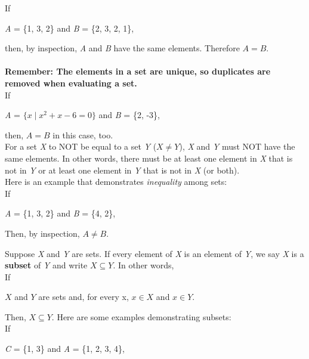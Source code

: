 If

\begin{center}
\textit{A} = \{1, 3, 2\} and \textit{B} = \{2, 3, 2, 1\},
\end{center}

then, by inspection, \textit{A} and \textit{B} have the same elements. Therefore $A = B$.\\\\\textbf{Remember: The elements in a set are unique, so duplicates are removed when evaluating a set.}\\

If

\begin{center}
\textit{A} = $\{x \mid x^2 + x - 6 = 0 \}$ and \textit{B} = \{2, -3\},
\end{center}

then, $A = B$ in this case, too.\\

For a set \textit{X} to NOT be equal to a set \textit{Y} ($X \neq Y$), \textit{X} and \textit{Y} must NOT have the same elements.  In other words, there must be at least one element in \textit{X} that is not in \textit{Y} or at least one element in \textit{Y} that is not in \textit{X} (or both).\\

Here is an example that demonstrates \textit{inequality} among sets:\\

If

\begin{center}
\textit{A} = \{1, 3, 2\} and \textit{B} = \{4, 2\},
\end{center}

Then, by inspection, $A \neq B$.
\clearpage

Suppose \textit{X} and \textit{Y} are sets.  If every element of \textit{X} is an element of \textit{Y}, we say \textit{X} is a \textbf{subset} of \textit{Y} and write $X \subseteq Y$.  In other words,\\

If

\begin{center}
$X$ and $Y$ are sets and, for every x, $x \in X$ and $x \in Y$.
\end{center}

Then, $X \subseteq Y$.  Here are some examples demonstrating subsets:\\

If

\begin{center}
\textit{C} = \{1, 3\} and \textit{A} = \{1, 2, 3, 4\},
\end{center}

